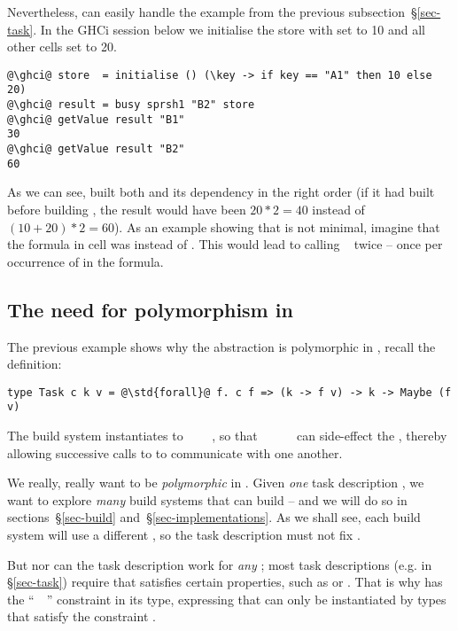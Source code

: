 Nevertheless,  can easily handle the example 
from the previous subsection~\S\ref{sec-task}. In the GHCi session below we
initialise the store with  set to 10 and all other cells set to 20.

\begin{verbatim}
@\ghci@ store  = initialise () (\key -> if key == "A1" then 10 else 20)
@\ghci@ result = busy sprsh1 "B2" store
@\ghci@ getValue result "B1"
30
@\ghci@ getValue result "B2"
60
\end{verbatim}

\noindent
As we can see,  built both  and its dependency  in the
right order (if it had built  before building , the result would
have been $20 * 2 = 40$ instead of $(10 + 20) * 2 = 60$). As an example showing
that  is not minimal, imagine that the formula in cell  was
 instead of . This would lead to calling
~ twice -- once per occurrence of  in the
formula.

\subsection{The need for polymorphism in }\label{sec-why-polymorphism}

The previous example shows why the  abstraction is polymorphic in , recall the definition:
\begin{verbatim}
type Task c k v = @\std{forall}@ f. c f => (k -> f v) -> k -> Maybe (f v)
\end{verbatim}
The  build system instantiates  to
~~~~,
so that ~\hs{::}~~\hs{->}~~ can side-effect the
, thereby allowing successive calls to  to communicate with
one another.

We really, really want  to be \emph{polymorphic} in .
Given \emph{one} task description , we want to explore \emph{many} build
systems that can build  -- and we will do so in sections~\S\ref{sec-build}
and~\S\ref{sec-implementations}. As we shall see, each build system will use a
different , so the task description must not fix .

But nor can the task description work for \emph{any} ; most task
descriptions (e.g.  in \S\ref{sec-task}) require that 
satisfies certain properties, such as  or . That is
why  has the ``~~\hs{=>}'' constraint in its type,
expressing that  can only be instantiated by types that satisfy the
constraint .

